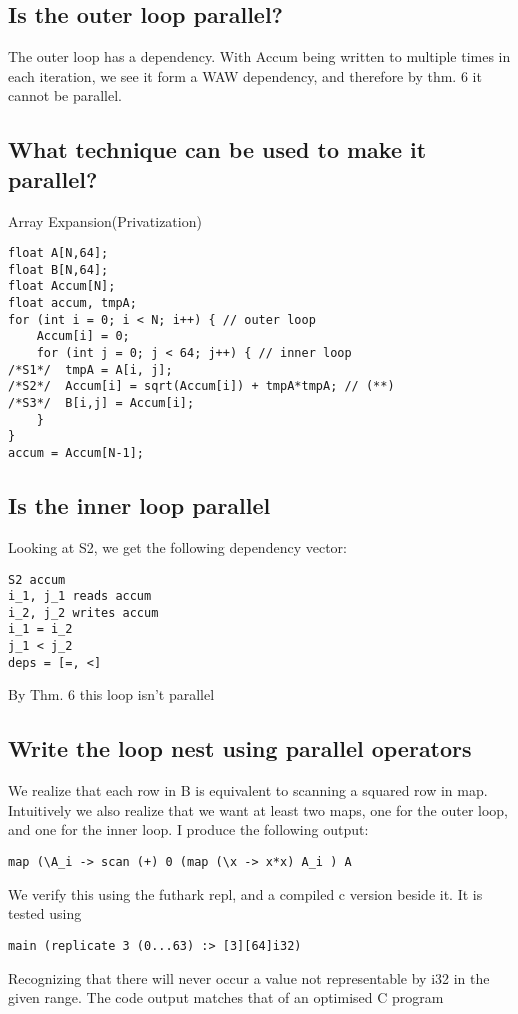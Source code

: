 \documentclass[11pt]{article}
\begin{document}
\subsection{Is the outer loop parallel?}
\label{sec:orgac0c849}
The outer loop has a dependency.  
With Accum being written to multiple times in each iteration, we see
it form a WAW dependency, and therefore by thm. 6 it cannot be parallel.

\subsection{What technique can be used to make it parallel?}
\label{sec:org950a87b}
Array Expansion(Privatization)
\begin{verbatim}
float A[N,64];
float B[N,64];
float Accum[N];
float accum, tmpA;
for (int i = 0; i < N; i++) { // outer loop
    Accum[i] = 0;
    for (int j = 0; j < 64; j++) { // inner loop
/*S1*/  tmpA = A[i, j];
/*S2*/  Accum[i] = sqrt(Accum[i]) + tmpA*tmpA; // (**)
/*S3*/  B[i,j] = Accum[i];
    }
}
accum = Accum[N-1];
\end{verbatim}

\subsection{Is the inner loop parallel}
\label{sec:org868ce9f}
Looking at S2, we get the following dependency vector:
\begin{verbatim}
S2 accum
i_1, j_1 reads accum
i_2, j_2 writes accum
i_1 = i_2
j_1 < j_2
deps = [=, <]
\end{verbatim}
By Thm. 6 this loop isn't parallel

\subsection{Write the loop nest using parallel operators}
\label{sec:orgd178f50}
We realize that each row in B is equivalent to scanning a squared row in map. Intuitively
we also realize that we want at least two maps, one for the outer loop, and one for the inner
loop. I produce the following output:
\begin{verbatim}
map (\A_i -> scan (+) 0 (map (\x -> x*x) A_i ) A
\end{verbatim}
We verify this using the futhark repl, and a compiled c version beside it. It is tested using
\begin{verbatim}
main (replicate 3 (0...63) :> [3][64]i32)
\end{verbatim}
Recognizing that there will never occur a value not representable by i32 in the given
range. The code output matches that of an optimised C program
\end{document}
